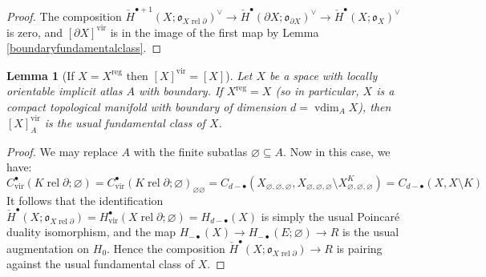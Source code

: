 \documentclass[12pt]{article}
\newtheorem{lemma}[theorem]{Lemma}
\theoremstyle{definition}
\theoremstyle{remark}
\numberwithin{equation}{subsection}
\newcommand{\oo}{\mathfrak o}
\newcommand{\cH}{\check H}
\newcommand{\vdim}{\operatorname{vdim}}
\newcommand{\vir}{\mathrm{vir}}
\newcommand{\reg}{\mathrm{reg}}
\newcommand{\rel}{\operatorname{rel}}
\begin{document}
\begin{proof}
The composition $\cH^{\bullet+1}(X;\oo_{X\rel\partial})^\vee\to\cH^\bullet(\partial X;\oo_{\partial X})^\vee\to\cH^\bullet(X;\oo_X)^\vee$ is zero, and $[\partial X]^\vir$ is in the image of the first map by Lemma \ref{boundaryfundamentalclass}.
\end{proof}

\begin{lemma}[{If $X=X^\reg$ then $[X]^\vir=[X]$}]\label{fclasstransverse}
Let $X$ be a space with locally orientable implicit atlas $A$ with boundary.  If $X^\reg=X$ (so in particular, $X$ is a compact topological manifold with boundary of dimension $d=\vdim_AX$), then $[X]^\vir_A$ is the usual fundamental class of $X$.
\end{lemma}

\begin{proof}
We may replace $A$ with the finite subatlas $\varnothing\subseteq A$.  Now in this case, we have:
\begin{equation}
C^\bullet_\vir(K\rel\partial;\varnothing)=C^\bullet_\vir(K\rel\partial;\varnothing)_{\varnothing\varnothing}=C_{d-\bullet}(X_{\varnothing,\varnothing,\varnothing},X_{\varnothing,\varnothing,\varnothing}\setminus X_{\varnothing,\varnothing,\varnothing}^K)=C_{d-\bullet}(X,X\setminus K)
\end{equation}
It follows that the identification $\cH^\bullet(X;\oo_{X\rel\partial})=H^\bullet_\vir(X\rel\partial;\varnothing)=H_{d-\bullet}(X)$ is simply the usual Poincar\'e duality isomorphism, and the map $H_{-\bullet}(X)\to H_{-\bullet}(E;\varnothing)\to R$ is the usual augmentation on $H_0$.  Hence the composition $\cH^\bullet(X;\oo_{X\rel\partial})\to R$ is pairing against the usual fundamental class of $X$.
\end{proof}
\end{document}
